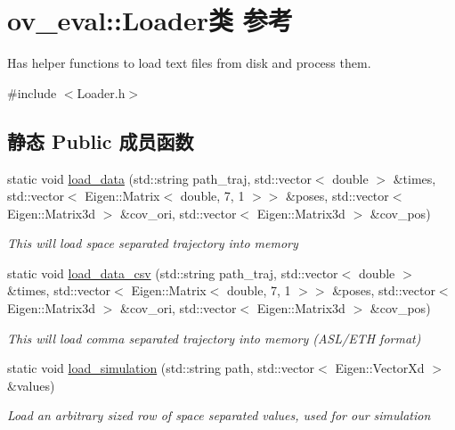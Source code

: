 \hypertarget{classov__eval_1_1Loader}{}\section{ov\+\_\+eval\+:\+:Loader类 参考}
\label{classov__eval_1_1Loader}


Has helper functions to load text files from disk and process them.  




{\ttfamily \#include $<$Loader.\+h$>$}

\subsection*{静态 Public 成员函数}
\begin{DoxyCompactItemize}
\item 
static void \hyperlink{classov__eval_1_1Loader_afdd99379f29b052ecf7bf197d21a911f}{load\+\_\+data} (std\+::string path\+\_\+traj, std\+::vector$<$ double $>$ \&times, std\+::vector$<$ Eigen\+::\+Matrix$<$ double, 7, 1 $>$$>$ \&poses, std\+::vector$<$ Eigen\+::\+Matrix3d $>$ \&cov\+\_\+ori, std\+::vector$<$ Eigen\+::\+Matrix3d $>$ \&cov\+\_\+pos)
\begin{DoxyCompactList}\small\item\em This will load {\itshape space} separated trajectory into memory \end{DoxyCompactList}\item 
static void \hyperlink{classov__eval_1_1Loader_abcb07f7d33c1ed0e9996775188861d87}{load\+\_\+data\+\_\+csv} (std\+::string path\+\_\+traj, std\+::vector$<$ double $>$ \&times, std\+::vector$<$ Eigen\+::\+Matrix$<$ double, 7, 1 $>$$>$ \&poses, std\+::vector$<$ Eigen\+::\+Matrix3d $>$ \&cov\+\_\+ori, std\+::vector$<$ Eigen\+::\+Matrix3d $>$ \&cov\+\_\+pos)
\begin{DoxyCompactList}\small\item\em This will load {\itshape comma} separated trajectory into memory (A\+S\+L/\+E\+TH format) \end{DoxyCompactList}\item 
static void \hyperlink{classov__eval_1_1Loader_a6ecab01ce0d594bc3a635925ea8a7321}{load\+\_\+simulation} (std\+::string path, std\+::vector$<$ Eigen\+::\+Vector\+Xd $>$ \&values)
\begin{DoxyCompactList}\small\item\em Load an arbitrary sized row of {\itshape space} separated values, used for our simulation \end{DoxyCompactList}\item 

\end{DoxyCompactItemize}
